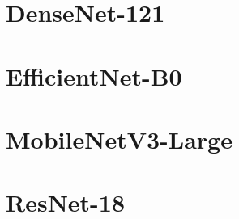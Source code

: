 
\appendix

\section{DenseNet-121}



\section{EfficientNet-B0}



\section{MobileNetV3-Large}



\section{ResNet-18}


